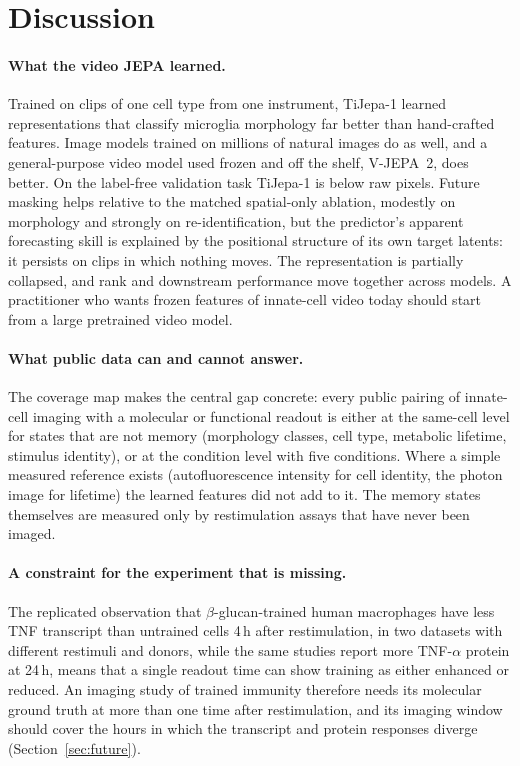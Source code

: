 \section{Discussion}
\label{sec:discussion}
\paragraph{What the video JEPA learned.} Trained on  clips of one cell type
from one instrument, TiJepa-1 learned representations that classify microglia morphology
far better than hand-crafted features. Image models trained on millions of natural images
do as well, and a general-purpose video model used frozen and off the shelf, V-JEPA~2,
does better. On the label-free validation task TiJepa-1 is below raw pixels.
Future masking helps relative to the matched spatial-only ablation, modestly on morphology
and strongly on re-identification, but the predictor's apparent forecasting skill is
explained by the positional structure of its own target latents: it persists on clips in
which nothing moves. The representation is partially collapsed, and rank and downstream
performance move together across models. A practitioner who wants frozen features of
innate-cell video today should start from a large pretrained video model.

\paragraph{What public data can and cannot answer.} The coverage map makes the central gap
concrete: every public pairing of innate-cell imaging with a molecular or functional readout
is either at the same-cell level for states that are not memory (morphology classes, cell
type, metabolic lifetime, stimulus identity), or at the condition level with five conditions.
Where a simple measured reference exists (autofluorescence intensity for cell identity,
the photon image for lifetime) the learned features did not add to it. The memory states
themselves are measured only by restimulation assays that have never been imaged.

\paragraph{A constraint for the experiment that is missing.} The replicated observation
that $\beta$-glucan-trained human macrophages have less TNF transcript than untrained cells
4\,h after restimulation, in two datasets with different restimuli and donors, while the
same studies report more TNF-$\alpha$ protein at 24\,h, means that a single readout time can
show training as either enhanced or reduced. An imaging study of trained immunity therefore
needs its molecular ground truth at more than one time after restimulation, and its
imaging window should cover the hours in which the transcript and protein responses
diverge (Section~\ref{sec:future}).
